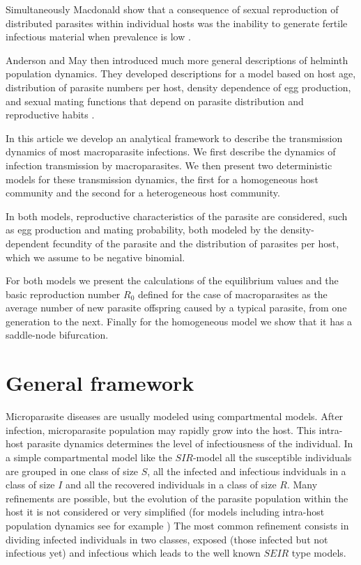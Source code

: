 \documentclass[12pt,a4paper]{article}
\theoremstyle{plain}%
\theoremstyle{definition}
\theoremstyle{remark}
\begin{document}
 	
 	Simultaneously Macdonald show that a consequence of sexual reproduction of distributed parasites within individual hosts was the inability to generate fertile infectious material when prevalence is low \cite{macdonald1965dynamics}.
 	

 	
 	Anderson and May then introduced much more general descriptions of helminth population dynamics. They developed descriptions for a model based on host age, distribution of parasite numbers per host, density dependence of egg production, and sexual mating functions that depend on parasite distribution and reproductive habits \cite{anderson1982population,anderson1992infectious}.
 	
 	
 	In this article we develop an analytical framework to describe the transmission dynamics of most macroparasite infections.
 	We first describe the dynamics of infection transmission by macroparasites. We then present two deterministic models for these transmission dynamics, the first for a homogeneous host community and the second for a heterogeneous host community.
 
 	
 	In both models, reproductive characteristics of the parasite are considered, such as egg production and mating probability, both modeled by the density-dependent fecundity of the parasite and the distribution of parasites per host, which we assume to be negative binomial.	

 	
 	For both models we present the calculations of the equilibrium values and the basic reproduction number $R_0$ defined for the case of macroparasites as the average number of new parasite offspring caused by a typical parasite, from one generation to the next.
 	Finally for the homogeneous model we show that it has a saddle-node bifurcation.
 	

	
\section{General framework}
	
	
Microparasite diseases are usually modeled using compartmental models. After infection,  microparasite population may rapidly grow into the host. This intra-host parasite dynamics determines the level of infectiousness of the individual. In a simple compartmental  model like the $SIR$-model  all the susceptible individuals are grouped in one class of size $S$, all the infected and infectious indviduals in a class of size $I$ and all the recovered individuals in a class of size $R$. Many refinements are possible, but the evolution of the parasite population within the host it is not considered or very simplified (for models including intra-host population dynamics 
see for example \cite{gandolfi2015epidemic})
The most common refinement consists in dividing infected individuals in two classes, exposed (those infected but not infectious yet) and infectious which leads to the well known $SEIR$ type models. 
\end{document}
